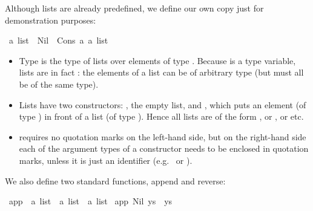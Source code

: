 \begin{isabellebody}
\begin{isamarkuptxt}
Although lists are already predefined, we define our own copy just for
demonstration purposes:%
\end{isamarkuptxt}%
\isamarkuptrue%
%
\endisatagproof
{\isafoldproof}%
%
\isadelimproof
%
\endisadelimproof
{}\isamarkupfalse%
\ {}a\ list\ {}\ Nil\ {}\ Cons\ {}a\ {}{}a\ list{}%
\begin{isamarkuptext}%
\begin{itemize}
\item Type  is the type of lists over elements of type . Because  is a type variable, lists are in fact : the elements of a list can be of arbitrary type (but must all be of the same type).
\item Lists have two constructors: , the empty list, and , which puts an element (of type ) in front of a list (of type ).
Hence all lists are of the form , or ,
or  etc.
\item {} requires no quotation marks on the
left-hand side, but on the right-hand side each of the argument
types of a constructor needs to be enclosed in quotation marks, unless
it is just an identifier (e.g.\  or ).
\end{itemize}
We also define two standard functions, append and reverse:%
\end{isamarkuptext}%
\isamarkuptrue%
\isamarkupfalse%
\ app\ {}{}\ {}{}a\ list\ {}\ {}a\ list\ {}\ {}a\ list{}\ \isanewline
{}app\ Nil\ ys\ {}\ ys{}\ {}\isanewline

\end{isabellebody}
